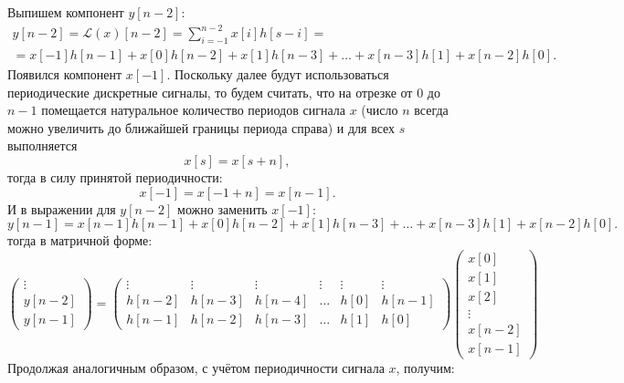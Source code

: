 Выпишем компонент $y[n-2]$:
\begin{multline*}
    y[n-2]
    = \mathcal{L}(x)[n-2]
    = \sum_{i=-1}^{n-2} x[i] h[s-i] = \\
    = x[-1] h[n-1] + x[0] h[n-2] + x[1] h[n-3] + \dots + x[n-3] h[1] + x[n-2] h[0] .
\end{multline*}
Появился компонент $x[-1]$. Поскольку далее будут использоваться периодические дискретные сигналы, то будем считать, что на отрезке от 0 до $n-1$ помещается натуральное количество
периодов сигнала $x$ (число $n$ всегда можно увеличить до ближайшей границы периода справа) и для всех $s$ выполняется
\[
    x[s] = x[s+n] ,
\]
тогда в силу принятой периодичности:
\[
    x[-1] = x[-1+n] = x[n-1].
\]
И в выражении для $y[n-2]$ можно заменить $x[-1]$:
\[
    y[n-1]
    = x[n-1] h[n-1] + x[0] h[n-2] + x[1] h[n-3] + \dots + x[n-3] h[1] + x[n-2] h[0] .
\]
тогда в матричной форме:
\[
    \begin{pmatrix}
        \vdots \\
        y[n-2] \\
        y[n-1]
    \end{pmatrix}
    = \begin{pmatrix}
          \vdots & \vdots & \vdots & \vdots & \vdots & \vdots \\
          h[n-2] & h[n-3] & h[n-4] & \dots  & h[0]   & h[n-1] \\
          h[n-1] & h[n-2] & h[n-3] & \dots  & h[1]   & h[0]
    \end{pmatrix}
    \begin{pmatrix}
        x[0]   \\
        x[1]   \\
        x[2]   \\
        \vdots \\
        x[n-2] \\
        x[n-1]
    \end{pmatrix}
\]
Продолжая аналогичным образом, с учётом периодичности сигнала $x$, получим:
